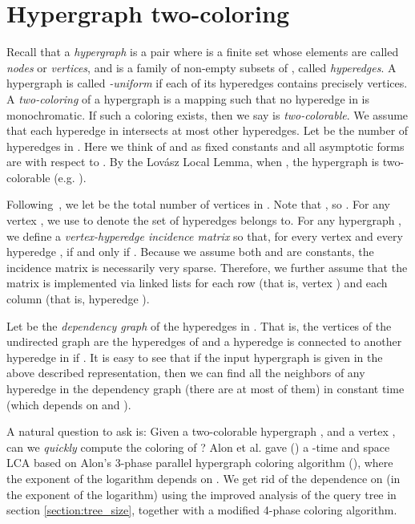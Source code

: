 \documentclass[english, oribibl]{llncs}
\begin{document}
\section{Hypergraph two-coloring}\label{Sec:hypergraph}
\label{app_hypergraph}
Recall that a \emph{hypergraph}  is a pair  where  is a finite set whose elements are
called \emph{nodes} or \emph{vertices}, and  is a family of non-empty subsets of , 
called \emph{hyperedges}. 
A hypergraph is called \emph{-uniform} if each of its
hyperedges contains precisely  vertices.
A \emph{two-coloring} of a hypergraph  is a mapping 
such that no hyperedge in  is monochromatic.
If such a coloring exists, then we say  is \emph{two-colorable}.
We assume that each
hyperedge in  intersects at most  other hyperedges.
Let  be the number of hyperedges in . Here we think of  and  as fixed constants
and all asymptotic forms are with respect to .
By the Lov{\'{a}}sz Local Lemma,
when , the hypergraph  is
two-colorable (e.g. \cite{Alo91}).

Following~\cite{RTVX11b}, we let  be the total number of vertices in . 
Note that , so .
For any vertex , we use  to denote the set of hyperedges  belongs to.
For any hypergraph ,
we define a \emph{vertex-hyperedge incidence matrix} 
so that, for every vertex  and every hyperedge , 
 if and only if .
Because we assume both  and  are constants, 
the incidence matrix  is necessarily very sparse. 
Therefore, we further assume that the matrix  is implemented via
linked lists for each row (that is, vertex ) and each column (that is, hyperedge ). 

Let  be the \emph{dependency graph} of the hyperedges in . 
That is, the vertices of the undirected graph 
are the  hyperedges of  and a hyperedge  is connected to
another hyperedge  in  if .
It is easy to see that if the input hypergraph is given in the 
above described representation, then we can find all the neighbors of any hyperedge  
in the dependency graph  (there are at most  of them) in constant time (which depends on  and ).

A natural question to ask is:
Given a two-colorable hypergraph , and a vertex ,
can we \emph{quickly} compute the coloring of ?
Alon et al. gave (\cite{ARV+11}) a -time and space LCA
based on Alon's 3-phase parallel hypergraph coloring algorithm (\cite{Alo91}),
where the exponent of the logarithm depends on .
We get rid of the dependence on  (in the exponent of the logarithm)
using the improved analysis of the query tree in section \ref{section:tree_size},
together with a modified 4-phase coloring algorithm.
\end{document}
